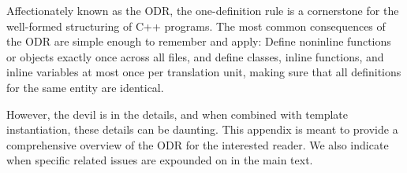 Affectionately known as the ODR, the one-definition rule is a cornerstone for the well-formed structuring of C++ programs. The most common consequences of the ODR are simple enough to remember and apply: Define noninline functions or objects exactly once across all files, and define classes, inline functions, and inline variables at most once per translation unit, making sure that all definitions for the same entity are identical.

However, the devil is in the details, and when combined with template instantiation, these details can be daunting. This appendix is meant to provide a comprehensive overview of the ODR for the interested reader. We also indicate when specific related issues are expounded on in the main text.
















































